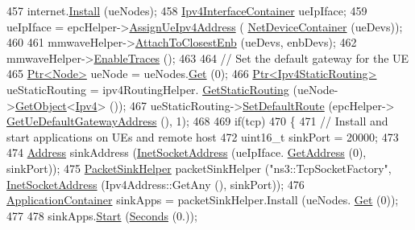 \begin{DoxyCode}
457         internet.\hyperlink{classns3_1_1InternetStackHelper_a6645b412f31283d2d9bc3d8a95cebbc0}{Install} (ueNodes);
458         \hyperlink{classns3_1_1Ipv4InterfaceContainer}{Ipv4InterfaceContainer} ueIpIface;
459         ueIpIface = epcHelper->\hyperlink{classns3_1_1MmWavePointToPointEpcHelper_ad96757d4c63d33f683dce1b5d6bca3b9}{AssignUeIpv4Address} (
      \hyperlink{classns3_1_1NetDeviceContainer}{NetDeviceContainer} (ueDevs));
460 
461         mmwaveHelper->\hyperlink{classns3_1_1MmWaveHelper_a202baea67b0af0d4fb6069de73766dc6}{AttachToClosestEnb} (ueDevs, enbDevs);
462         mmwaveHelper->\hyperlink{classns3_1_1MmWaveHelper_a4eae3871876b62965d612d9a56ed21bc}{EnableTraces} ();
463 
464         \textcolor{comment}{// Set the default gateway for the UE}
465         \hyperlink{classns3_1_1Ptr}{Ptr<Node>} ueNode = ueNodes.\hyperlink{classns3_1_1NodeContainer_a9ed96e2ecc22e0f5a3d4842eb9bf90bf}{Get} (0);
466         \hyperlink{classns3_1_1Ptr}{Ptr<Ipv4StaticRouting>} ueStaticRouting = ipv4RoutingHelper.
      \hyperlink{classns3_1_1Ipv4StaticRoutingHelper_a731206e50d305695dac7fb2ef963a4bb}{GetStaticRouting} (ueNode->\hyperlink{classns3_1_1Object_a13e18c00017096c8381eb651d5bd0783}{GetObject}<\hyperlink{classns3_1_1Ipv4}{Ipv4}> ());
467         ueStaticRouting->\hyperlink{classns3_1_1Ipv4StaticRouting_aee30fa3246c2b42f122dabdff2725331}{SetDefaultRoute} (epcHelper->
      \hyperlink{classns3_1_1MmWavePointToPointEpcHelper_afefac14ad79ff059b052305013d2beb3}{GetUeDefaultGatewayAddress} (), 1);
468 
469         \textcolor{keywordflow}{if}(tcp)
470         \{
471         \textcolor{comment}{// Install and start applications on UEs and remote host}
472         uint16\_t sinkPort = 20000;
473 
474         \hyperlink{classns3_1_1Address}{Address} sinkAddress (\hyperlink{classns3_1_1InetSocketAddress}{InetSocketAddress} (ueIpIface.
      \hyperlink{classns3_1_1Ipv4InterfaceContainer_ae63208dcd222be986822937ee4aa828c}{GetAddress} (0), sinkPort));
475         \hyperlink{classns3_1_1PacketSinkHelper}{PacketSinkHelper} packetSinkHelper (\textcolor{stringliteral}{"ns3::TcpSocketFactory"}, 
      \hyperlink{classns3_1_1InetSocketAddress}{InetSocketAddress} (Ipv4Address::GetAny (), sinkPort));
476         \hyperlink{classns3_1_1ApplicationContainer}{ApplicationContainer} sinkApps = packetSinkHelper.Install (ueNodes.
      \hyperlink{classns3_1_1NodeContainer_a9ed96e2ecc22e0f5a3d4842eb9bf90bf}{Get} (0));
477 
478         sinkApps.\hyperlink{classns3_1_1ApplicationContainer_a8eff87926507020bbe3e1390358a54a7}{Start} (\hyperlink{group__timecivil_ga33c34b816f8ff6628e33d5c8e9713b9e}{Seconds} (0.));

\end{DoxyCode}
